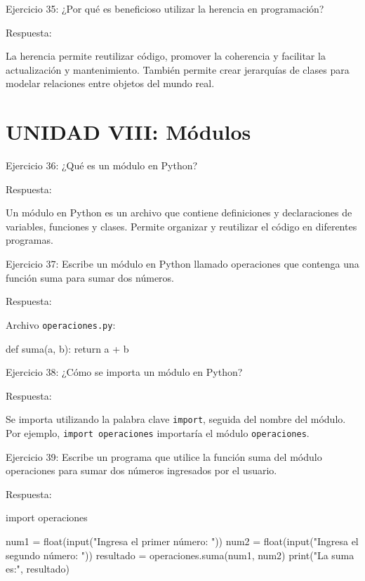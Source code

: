 \documentclass[
  a4paper,
  DIV=11,
  numbers=noendperiod,
  onepage,
  openany]{scrreprt}
\newenvironment{Shaded}{\begin{snugshade}}{\end{snugshade}}
\newcommand{\BuiltInTok}[1]{\textcolor[rgb]{0.00,0.23,0.31}{#1}}
\newcommand{\ControlFlowTok}[1]{\textcolor[rgb]{0.00,0.23,0.31}{#1}}
\newcommand{\ImportTok}[1]{\textcolor[rgb]{0.00,0.46,0.62}{#1}}
\newcommand{\KeywordTok}[1]{\textcolor[rgb]{0.00,0.23,0.31}{#1}}
\newcommand{\NormalTok}[1]{\textcolor[rgb]{0.00,0.23,0.31}{#1}}
\newcommand{\OperatorTok}[1]{\textcolor[rgb]{0.37,0.37,0.37}{#1}}
\newcommand{\StringTok}[1]{\textcolor[rgb]{0.13,0.47,0.30}{#1}}
\begin{document}
Ejercicio 35: ¿Por qué es beneficioso utilizar la herencia en
programación?

Respuesta:

La herencia permite reutilizar código, promover la coherencia y
facilitar la actualización y mantenimiento. También permite crear
jerarquías de clases para modelar relaciones entre objetos del mundo
real.

\hypertarget{unidad-viii-muxf3dulos-1}{%
\section{UNIDAD VIII: Módulos}\label{unidad-viii-muxf3dulos-1}}

Ejercicio 36: ¿Qué es un módulo en Python?

Respuesta:

Un módulo en Python es un archivo que contiene definiciones y
declaraciones de variables, funciones y clases. Permite organizar y
reutilizar el código en diferentes programas.

Ejercicio 37: Escribe un módulo en Python llamado operaciones que
contenga una función suma para sumar dos números.

Respuesta:

Archivo \texttt{operaciones.py}:

\begin{Shaded}
\begin{Highlighting}[]
\KeywordTok{def}\NormalTok{ suma(a, b):}
    \ControlFlowTok{return}\NormalTok{ a }\OperatorTok{+}\NormalTok{ b}
\end{Highlighting}
\end{Shaded}

Ejercicio 38: ¿Cómo se importa un módulo en Python?

Respuesta:

Se importa utilizando la palabra clave \texttt{import}, seguida del
nombre del módulo. Por ejemplo, \texttt{import\ operaciones} importaría
el módulo \texttt{operaciones}.

Ejercicio 39: Escribe un programa que utilice la función suma del módulo
operaciones para sumar dos números ingresados por el usuario.

Respuesta:

\begin{Shaded}
\begin{Highlighting}[]
\ImportTok{import}\NormalTok{ operaciones}

\NormalTok{num1 }\OperatorTok{=} \BuiltInTok{float}\NormalTok{(}\BuiltInTok{input}\NormalTok{(}\StringTok{"Ingresa el primer número: "}\NormalTok{))}
\NormalTok{num2 }\OperatorTok{=} \BuiltInTok{float}\NormalTok{(}\BuiltInTok{input}\NormalTok{(}\StringTok{"Ingresa el segundo número: "}\NormalTok{))}
\NormalTok{resultado }\OperatorTok{=}\NormalTok{ operaciones.suma(num1, num2)}
\BuiltInTok{print}\NormalTok{(}\StringTok{"La suma es:"}\NormalTok{, resultado)}
\end{Highlighting}
\end{Shaded}
\end{document}
